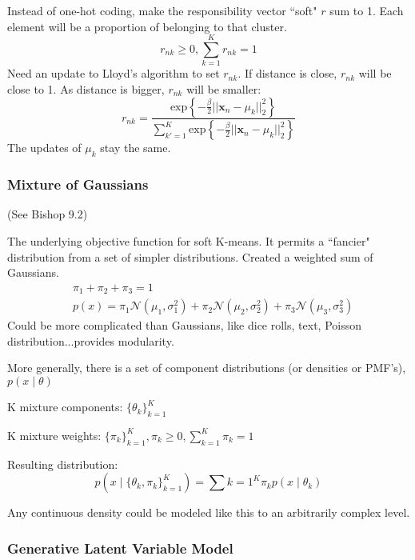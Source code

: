 \documentclass[11pt, oneside]{article}   	%
\begin{document}
Instead of one-hot coding, make the responsibility vector ``soft" $r$ sum to 1. Each element will be a proportion of belonging to that cluster.
\begin{equation}
r_{nk} \ge 0, \sum_{k=1}^K r_{nk} = 1
\end{equation}
Need an update to Lloyd's algorithm to set $r_{nk}$. If distance is close, $r_{nk}$ will be close to 1. As distance is bigger, $r_{nk}$ will be smaller:
\begin{equation}
r_{nk} = \frac{\text{exp} \left\{ -\frac{\beta}{2} ||\mathbf{x}_n - \mu_k||_2^2 \right\}}
			 {\sum_{k'=1}^K\text{exp} \left\{ -\frac{\beta}{2} ||\mathbf{x}_n - \mu_k||_2^2 \right\} }
\end{equation}
The updates of $\mu_k$ stay the same.

\subsubsection{Mixture of Gaussians}

(See Bishop 9.2)

The underlying objective function for soft K-means. It permits a ``fancier" distribution from a set of simpler distributions. Created a weighted sum of Gaussians.
\begin{align}
&\pi_1 + \pi_2 + \pi_3 = 1\\
&p(x) = \pi_1 \mathcal{N}(\mu_1,\sigma_1^2) + \pi_2 \mathcal{N}(\mu_2,\sigma_2^2) + \pi_3 \mathcal{N}(\mu_3,\sigma_3^2)
\end{align}
Could be more complicated than Gaussians, like dice rolls, text, Poisson distribution...provides modularity.

More generally, there is a set of component distributions (or densities or PMF's),  \mbox{$p(x \mid \theta)$}

K mixture components: $\{ \theta_k \}_{k=1}^K$

K mixture weights: $\{ \pi_k \}_{k=1}^K, \pi_k \ge 0, \sum_{k=1}^K \pi_k = 1$

Resulting distribution:
\begin{equation}
p(x \mid \{\theta_k, \pi_k\}_{k=1}^K) = \sum{k=1}^K \pi_k p(x \mid \theta_k)
\end{equation}

Any continuous density could be modeled like this to an arbitrarily complex level.

\subsubsection{Generative Latent Variable Model}
\end{document}
